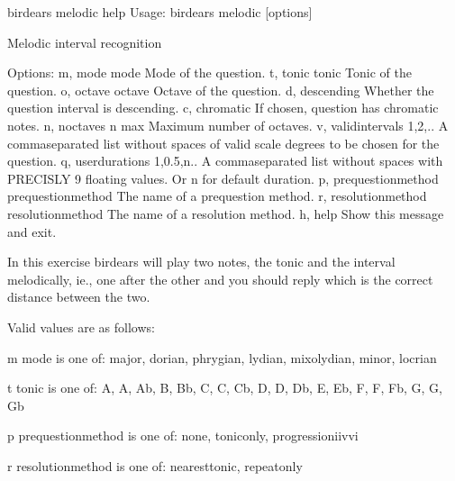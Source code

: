 \documentclass[letterpaper,10pt,english]{sphinxmanual}
\begin{document}
\begin{sphinxVerbatim}[commandchars=\\\{\}]
\PYGZdl{} birdears melodic \PYGZhy{}\PYGZhy{}help
Usage: birdears melodic [options]

  Melodic interval recognition

Options:
  \PYGZhy{}m, \PYGZhy{}\PYGZhy{}mode \PYGZlt{}mode\PYGZgt{}               Mode of the question.
  \PYGZhy{}t, \PYGZhy{}\PYGZhy{}tonic \PYGZlt{}tonic\PYGZgt{}             Tonic of the question.
  \PYGZhy{}o, \PYGZhy{}\PYGZhy{}octave \PYGZlt{}octave\PYGZgt{}           Octave of the question.
  \PYGZhy{}d, \PYGZhy{}\PYGZhy{}descending                Whether the question interval is descending.
  \PYGZhy{}c, \PYGZhy{}\PYGZhy{}chromatic                 If chosen, question has chromatic notes.
  \PYGZhy{}n, \PYGZhy{}\PYGZhy{}n\PYGZus{}octaves \PYGZlt{}n max\PYGZgt{}         Maximum number of octaves.
  \PYGZhy{}v, \PYGZhy{}\PYGZhy{}valid\PYGZus{}intervals \PYGZlt{}1,2,..\PYGZgt{}  A comma\PYGZhy{}separated list without spaces
                                  of valid scale degrees to be chosen for the
                                  question.
  \PYGZhy{}q, \PYGZhy{}\PYGZhy{}user\PYGZus{}durations \PYGZlt{}1,0.5,n..\PYGZgt{}
                                  A comma\PYGZhy{}separated list without
                                  spaces with PRECISLY 9 floating values. Or
                                  \PYGZsq{}n\PYGZsq{} for default              duration.
  \PYGZhy{}p, \PYGZhy{}\PYGZhy{}prequestion\PYGZus{}method \PYGZlt{}prequestion\PYGZus{}method\PYGZgt{}
                                  The name of a pre\PYGZhy{}question method.
  \PYGZhy{}r, \PYGZhy{}\PYGZhy{}resolution\PYGZus{}method \PYGZlt{}resolution\PYGZus{}method\PYGZgt{}
                                  The name of a resolution method.
  \PYGZhy{}h, \PYGZhy{}\PYGZhy{}help                      Show this message and exit.

  In this exercise birdears will play two notes, the tonic and the interval
  melodically, ie., one after the other and you should reply which is the
  correct distance between the two.

  Valid values are as follows:

  \PYGZhy{}m \PYGZlt{}mode\PYGZgt{} is one of: major, dorian, phrygian, lydian, mixolydian, minor,
  locrian

  \PYGZhy{}t \PYGZlt{}tonic\PYGZgt{} is one of: A, A\PYGZsh{}, Ab, B, Bb, C, C\PYGZsh{}, Cb, D, D\PYGZsh{}, Db, E, Eb, F,
  F\PYGZsh{}, Fb, G, G\PYGZsh{}, Gb

  \PYGZhy{}p \PYGZlt{}prequestion\PYGZus{}method\PYGZgt{} is one of: none, tonic\PYGZus{}only, progression\PYGZus{}i\PYGZus{}iv\PYGZus{}v\PYGZus{}i

  \PYGZhy{}r \PYGZlt{}resolution\PYGZus{}method\PYGZgt{} is one of: nearest\PYGZus{}tonic, repeat\PYGZus{}only
\end{sphinxVerbatim}
\end{document}
